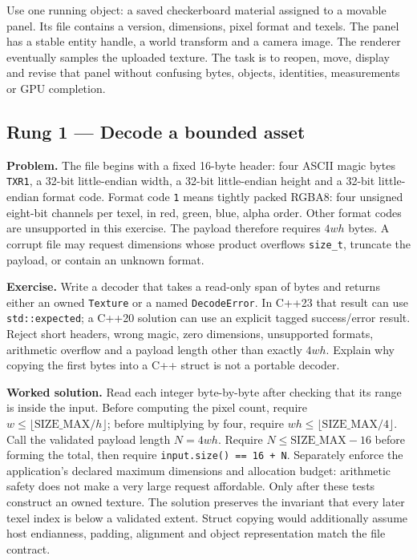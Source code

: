 Use one running object: a saved checkerboard material assigned to a movable panel. Its file contains a version, dimensions, pixel format and texels. The panel has a stable entity handle, a world transform and a camera image. The renderer eventually samples the uploaded texture. The task is to reopen, move, display and revise that panel without confusing bytes, objects, identities, measurements or GPU completion.

\subsection{Rung 1 --- Decode a bounded asset}\label{02-foundations-ii-ch038-rung-1-decode-a-bounded-asset}

\textbf{Problem.} The file begins with a fixed 16-byte header: four ASCII magic bytes \texttt{TXR1}, a 32-bit little-endian width, a 32-bit little-endian height and a 32-bit little-endian format code. Format code \texttt{1} means tightly packed RGBA8: four unsigned eight-bit channels per texel, in red, green, blue, alpha order. Other format codes are unsupported in this exercise. The payload therefore requires \(4wh\) bytes. A corrupt file may request dimensions whose product overflows \texttt{size\_t}, truncate the payload, or contain an unknown format.

\textbf{Exercise.} Write a decoder that takes a read-only span of bytes and returns either an owned \texttt{Texture} or a named \texttt{DecodeError}. In C++23 that result can use \texttt{std::expected}; a C++20 solution can use an explicit tagged success/error result. Reject short headers, wrong magic, zero dimensions, unsupported formats, arithmetic overflow and a payload length other than exactly \(4wh\). Explain why copying the first bytes into a C++ struct is not a portable decoder.

\textbf{Worked solution.} Read each integer byte-by-byte after checking that its range is inside the input. Before computing the pixel count, require \(w \le \lfloor\text{SIZE_MAX}/h\rfloor\); before multiplying by four, require \(wh \le \lfloor\text{SIZE_MAX}/4\rfloor\). Call the validated payload length \(N=4wh\). Require \(N\leq\mathrm{SIZE\_MAX}-16\) before forming the total, then require \texttt{input.size()\ ==\ 16\ +\ N}. Separately enforce the application's declared maximum dimensions and allocation budget: arithmetic safety does not make a very large request affordable. Only after these tests construct an owned texture. The solution preserves the invariant that every later texel index is below a validated extent. Struct copying would additionally assume host endianness, padding, alignment and object representation match the file contract.

